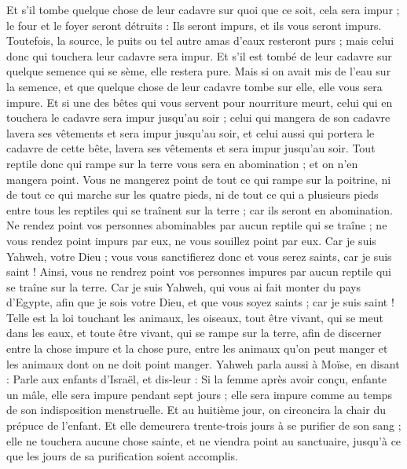 \begin{multicols}{2}
Et s'il tombe quelque chose de leur cadavre sur quoi que ce soit, cela sera impur ; le four et le foyer seront détruits : Ils seront impurs, et ils vous seront impurs.
Toutefois, la source, le puits ou tel autre amas d'eaux resteront purs ; mais celui donc qui touchera leur cadavre sera impur.
Et s'il est tombé de leur cadavre sur quelque semence qui se sème, elle restera pure.
Mais si on avait mis de l'eau sur la semence, et que quelque chose de leur cadavre tombe sur elle, elle vous sera impure.
Et si une des bêtes qui vous servent pour nourriture meurt, celui qui en touchera le cadavre sera impur jusqu'au soir ;
celui qui mangera de son cadavre lavera ses vêtements et sera impur jusqu'au soir, et celui aussi qui portera le cadavre de cette bête, lavera ses vêtements et sera impur jusqu'au soir.
Tout reptile donc qui rampe sur la terre vous sera en abomination ; et on n'en mangera point.
Vous ne mangerez point de tout ce qui rampe sur la poitrine, ni de tout ce qui marche sur les quatre pieds, ni de tout ce qui a plusieurs pieds entre tous les reptiles qui se traînent sur la terre ; car ils seront en abomination.
Ne rendez point vos personnes abominables par aucun reptile qui se traîne ; ne vous rendez point impurs par eux, ne vous souillez point par eux.
Car je suis Yahweh, votre Dieu ; vous vous sanctifierez donc et vous serez saints, car je suis saint ! Ainsi, vous ne rendrez point vos personnes impures par aucun reptile qui se traîne sur la terre.
Car je suis Yahweh, qui vous ai fait monter du pays d'Egypte, afin que je sois votre Dieu, et que vous soyez saints ; car je suis saint !
Telle est la loi touchant les animaux, les oiseaux, tout être vivant, qui se meut dans les eaux, et toute être vivant, qui se rampe sur la terre,
afin de discerner entre la chose impure et la chose pure, entre les animaux qu'on peut manger et les animaux dont on ne doit point manger.
\VerseOne{}Yahweh parla aussi à Moïse, en disant :
Parle aux enfants d'Israël, et dis-leur : Si la femme après avoir conçu, enfante un mâle, elle sera impure pendant sept jours ; elle sera impure comme au temps de son indisposition menstruelle.
Et au huitième jour, on circoncira la chair du prépuce de l'enfant.
Et elle demeurera trente-trois jours à se purifier de son sang ; elle ne touchera aucune chose sainte, et ne viendra point au sanctuaire, jusqu'à ce que les jours de sa purification soient accomplis.

\end{multicols}
